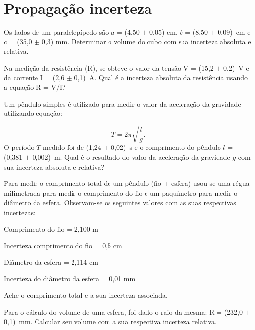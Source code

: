 \chapter{Propagação incerteza}

\vspace{-0.7cm}

\begin{num}

\item Os lados de um paralelepípedo são $a$ = (4,50 $\pm$ 0,05) cm, $b$ = (8,50 $\pm$ 0,09)~cm e $c$ = (35,0 $\pm$ 0,3) mm. Determinar o volume do cubo com sua incerteza absoluta e relativa.

\item Na medição da resistência (R), se obteve o valor da tensão V = (15,2 $\pm$ 0,2)~V e da corrente I = (2,6 $\pm$ 0,1)~A. Qual é a incerteza absoluta da resistência usando a equação R = V/I?
 
\item Um pêndulo simples é utilizado para medir o valor da aceleração da gravidade utilizando equação:

\[ 
T = 2 \pi \sqrt{\frac{l}{g}}.
\]
\noindent
O período $T$ medido foi de (1,24 $\pm$ 0,02)~s e o comprimento do pêndulo $l$ = (0,381 $\pm$ 0,002)~m. Qual é o resultado do valor da aceleração da gravidade $g$ com sua incerteza absoluta e relativa?

\item Para medir o comprimento total de um pêndulo (fio + esfera) usou-se uma régua milimetrada para medir o comprimento do fio e um paquímetro para medir o diâmetro da esfera. Observam-se os seguintes valores com as suas respectivas incertezas: 
\begin{iten}
\item[ ]Comprimento do fio = 2,100 m			
\item[ ] Incerteza comprimento do fio = 0,5 cm
\item[ ]Diâmetro da esfera = 2,114 cm			
\item[ ] Incerteza do diâmetro da esfera = 0,01 mm
\end{iten}
\noindent 
Ache o comprimento total e a sua incerteza associada.

\item Para o cálculo do volume de uma esfera, foi dado o raio da mesma: R = (232,0 $\pm$ 0,1)~mm. Calcular seu volume com a sua respectiva incerteza relativa.


\end{num}
